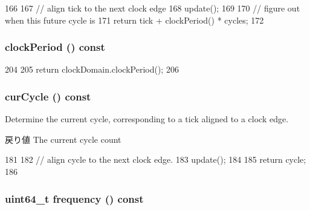 \begin{DoxyCode}
166     {
167         // align tick to the next clock edge
168         update();
169 
170         // figure out when this future cycle is
171         return tick + clockPeriod() * cycles;
172     }
\end{DoxyCode}
\hypertarget{classClockedObject_a78c89cef17196c60470c4f2f76d43d8a}{
\subsubsection[{clockPeriod}]{ clockPeriod () const}}
\label{classClockedObject_a78c89cef17196c60470c4f2f76d43d8a}



\begin{DoxyCode}
204     {
205         return clockDomain.clockPeriod();
206     }
\end{DoxyCode}
\hypertarget{classClockedObject_a3f6dfa1d3e7cd47666433b6caa4d34d6}{
\subsubsection[{curCycle}]{ curCycle () const}}
\label{classClockedObject_a3f6dfa1d3e7cd47666433b6caa4d34d6}
Determine the current cycle, corresponding to a tick aligned to a clock edge.

\begin{DoxyReturn}{戻り値}
The current cycle count 
\end{DoxyReturn}



\begin{DoxyCode}
181     {
182         // align cycle to the next clock edge.
183         update();
184 
185         return cycle;
186     }
\end{DoxyCode}
\hypertarget{classClockedObject_a47ad0ff313f0dcb63b8223b1f11d49d8}{
\subsubsection[{frequency}]{\setlength{\rightskip}{0pt plus 5cm}uint64\_\-t frequency () const}}
\label{classClockedObject_a47ad0ff313f0dcb63b8223b1f11d49d8}



